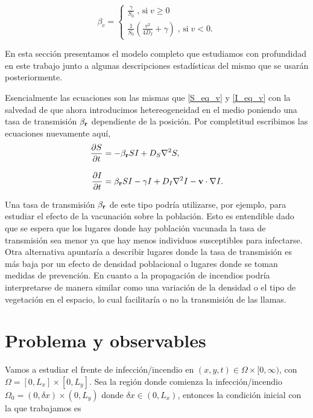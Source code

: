 \begin{equation}
  \beta_c = 
  \begin{cases}
    \frac{\gamma}{S_0} \; \text{, si} \; v\geq 0 \\
    \frac{1}{S_0}(\frac{v^2}{4D_I}+\gamma) \; \text{, si} \; v<0.
  \end{cases}
\end{equation}



En esta sección presentamos el modelo completo que estudiamos con profundidad en este trabajo junto a algunas descripciones estadísticas del mismo que se usarán 
posteriormente. 

Esencialmente las ecuaciones son las mismas que \ref{S_eq_v} y \ref{I_eq_v} con la salvedad de que ahora introducimos hetereogeneidad en el medio poniendo 
una tasa de transmisión $\beta_{\vb{r}}$ dependiente de la posición. Por completitud escribimos las ecuaciones nuevamente aquí,
\begin{align}
  \pdv{S}{t}&=-\beta_{\vb{r}} SI + D_{S} \laplacian{S}  ,\label{Seqfinal}\\[.3cm]
  \pdv{I}{t}&=\beta_{\vb{r}} SI - \gamma I + D_{I} \laplacian{I} - \mathbf{v} \cdot \nabla I.\label{Ieqfinal}
\end{align}

Una tasa de transmisión $\beta_{\vb{r}}$ de este tipo podría utilizarse, por ejemplo, para estudiar el efecto de la vacunación sobre la población. Esto es 
entendible dado que se espera que los lugares donde hay población vacunada la tasa de transmisión sea menor ya que hay menos individuos susceptibles para
infectarse. Otra alternativa apuntaría a describir lugares donde la tasa de transmisión es más baja por un efecto de densidad poblacional o lugares donde se toman medidas de prevención. 
En cuanto a la propagación de incendios podría interpretarse de manera similar como una variación de la densidad o el tipo de vegetación en el espacio, lo cual 
facilitaría o no la transmisión de las llamas.

\section{Problema y observables}
\label{Problema}

Vamos a estudiar el frente de infección/incendio en $(x,y,t) \in \Omega \times [0,\infty)$, con $\Omega = [0,L_x] \times [0,L_y]$. Sea la región donde 
comienza la infección/incendio $\Omega_0 = (0,\delta x) \times (0,L_y)$ donde $\delta x \in (0,L_x)$, entonces la condición inicial con la que trabajamos es

